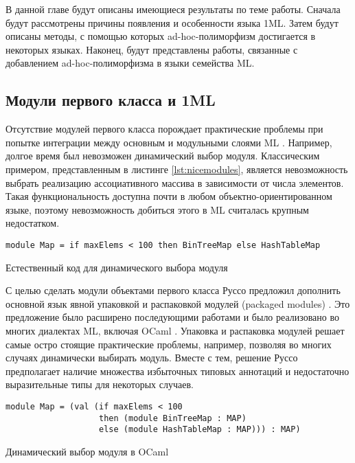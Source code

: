 \documentclass[../diploma.tex]{subfiles}
\begin{document}
 \label{sec:domain_review}

В данной главе будут описаны имеющиеся результаты по теме работы. Сначала будут рассмотрены причины появления и особенности языка 1ML. Затем будут описаны методы, с помощью которых ad-hoc-полиморфизм достигается в некоторых языках. Наконец, будут представлены работы, связанные с добавлением ad-hoc-полиморфизма в языки семейства ML.

\subsection{Модули первого класса и 1ML}

Отсутствие модулей первого класса порождает практические проблемы при попытке интеграции между основным и модульными слоями ML \cite{1ml}. Например, долгое время был невозможен динамический выбор модуля. Классическим примером, представленным в листинге \ref{lst:nicemodules}, является невозможность выбрать реализацию ассоциативного массива в зависимости от числа элементов. Такая функциональность доступна почти в любом объектно-ориентированном языке, поэтому невозможность добиться этого в ML считалась крупным недостатком.

\begin{listing}[H]
\begin{verbatim}
module Map = if maxElems < 100 then BinTreeMap else HashTableMap 
\end{verbatim}
\caption{Естественный код для динамического выбора модуля}
\label{lst:nicemodules}
\end{listing}

С целью сделать модули объектами первого класса Руссо предложил дополнить основной язык явной упаковкой и распаковкой модулей (packaged modules) \cite{packaged}. Это предложение было расширено последующими работами \cite{aliceml} \cite{dreyer_thesis} и было реализовано во многих диалектах ML, включая OCaml \cite{packaged_ocaml}. Упаковка и распаковка модулей решает самые остро стоящие практические проблемы, например, позволяя во многих случаях динамически выбирать модуль. Вместе с тем, решение Руссо предполагает наличие множества избыточных типовых аннотаций и недостаточно выразительные типы для некоторых случаев.

\begin{listing}[H]
\begin{verbatim}
module Map = (val (if maxElems < 100 
                   then (module BinTreeMap : MAP)
                   else (module HashTableMap : MAP))) : MAP)
\end{verbatim}
\caption{Динамический выбор модуля в OCaml}
\label{lst:badmodules}
\end{listing}
\end{document}
